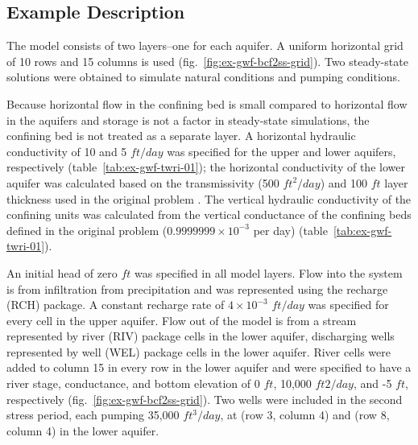 \subsection{Example Description}
The model consists of two layers--one for each aquifer. A uniform horizontal grid of 10 rows and 15 columns is used (fig.~\ref{fig:ex-gwf-bcf2ss-grid}). Two steady-state solutions were obtained to simulate natural conditions and pumping conditions. 

Because horizontal flow in the confining bed is small compared to horizontal flow in the aquifers and storage is not a factor in steady-state simulations, the confining bed is not treated as a separate layer. A horizontal hydraulic conductivity of 10 and 5 $ft/day$ was specified for the upper and lower aquifers, respectively (table~\ref{tab:ex-gwf-twri-01}); the horizontal conductivity of the lower aquifer was calculated based on the transmissivity (500 $ft^2/day$) and 100 $ft$ layer thickness used in the original problem \citep{mcdonaldetal1991wetdry}. The vertical hydraulic conductivity of the confining units was calculated from the vertical conductance of the confining beds defined in the original problem ($0.9999999 \times 10^{-3}$ per day)  (table~\ref{tab:ex-gwf-twri-01}).



An initial head of zero $ft$ was specified in all model layers. Flow into the system is from infiltration from precipitation and was represented using the recharge (RCH) package. A constant recharge rate of $4 \times 10^{-3}$ $ft/day$ was specified for every cell in the upper aquifer. Flow out of the model is from a stream represented by river (RIV) package cells in the lower aquifer, discharging wells represented by well (WEL) package cells in the lower aquifer. River cells were added to column 15 in every row in the lower aquifer and were specified to have a river stage, conductance, and bottom elevation of 0 $ft$, 10,000 $ft2/day$, and -5 $ft$, respectively (fig.~\ref{fig:ex-gwf-bcf2ss-grid}). Two wells were included in the second stress period, each pumping 35,000 $ft^3/day$, at (row 3, column 4) and (row 8, column 4) in the lower aquifer. 

